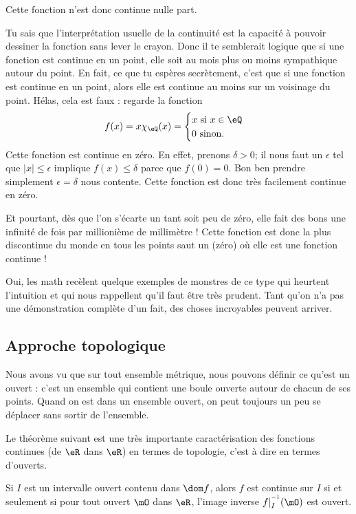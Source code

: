 \documentclass{article}
\begin{document}
Cette fonction n'est donc continue nulle part. 

Tu sais que l'interprétation usuelle de la continuité est la capacité à pouvoir dessiner la fonction sans lever le crayon. Donc il te semblerait logique que si une fonction est continue en un point, elle soit au mois plus ou moins sympathique autour du point. En fait, ce que tu espères secrètement, c'est que si une fonction est continue en un point, alors elle est continue au moins sur un voisinage du point. Hélas, cela est faux : regarde la fonction
\[ 
  f(x)=x\chi_{\eQ}(x)=
\begin{cases}
x\text{ si $x\in\eQ$}\\
0\text{ sinon.}
\end{cases}
\]
Cette fonction est continue en zéro. En effet, prenons $\delta>0$; il nous faut un $\epsilon$ tel que $| x |\leq\epsilon$ implique $f(x)\leq \delta$ parce que $f(0)=0$. Bon ben prendre simplement $\epsilon=\delta$ nous contente. Cette fonction est donc très facilement continue en zéro.

Et pourtant, dès que l'on s'écarte un tant soit peu de zéro, elle fait des bons une infinité de fois par millionième de millimètre ! Cette fonction est donc la plus discontinue du monde en tous les points saut un (zéro) où elle est une fonction continue !

Oui, les math recèlent quelque exemples de monstres de ce type qui heurtent l'intuition et qui nous rappellent qu'il faut être très prudent. Tant qu'on n'a pas une démonstration complète d'un fait, des choses incroyables peuvent arriver.

\subsection{Approche topologique}

Nous avons vu que sur tout ensemble métrique, nous pouvons définir ce qu'est un ouvert : c'est un ensemble qui contient une boule ouverte autour de chacun de ses points. Quand on est dans un ensemble ouvert, on peut toujours un peu se déplacer sans sortir de l'ensemble.

Le théorème suivant est une très importante caractérisation des fonctions continues (de $\eR$ dans $\eR$) en termes de topologie, c'est à dire en termes d'ouverts.

\begin{theorem}		\label{ThoContInvOuvert}
Si $I$ est un intervalle ouvert contenu dans $\dom f$, alors $f$ est continue sur $I$ si et seulement si pour tout ouvert $\mO$ dans $\eR$, l'image inverse $f|_I^{^{-1}}(\mO)$ est ouvert.
\end{theorem}
\end{document}

